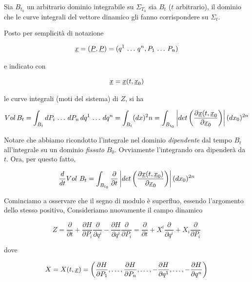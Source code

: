 Sia $ B_{t_0} $ un arbitrario dominio integrabile su $ \Sigma_{T_0} $ sia $ B_t $ ($ t $ arbitrario), il dominio che le curve integrali del vettore dinamico gli fanno corrispondere su $ \Sigma_t $.

Posto per semplicità di notazione

\begin{equation*}
\uline{x} = (\uline{P}, \uline{P}) = (q^1 \, \dots \, q^n, P_1 \, \dots \, P_n)
\end{equation*}

e indicato con

\begin{equation*}
\uline{x} = \uline{x} (t, \uline{x}_0)
\end{equation*}

le curve integrali (moti del sistema) di $ Z $, si ha

\begin{equation*}
Vol \, B_t  = \int_{B_t} dP_i \, \dots \, dP_n \, dq^1 \, \dots \, dq^n = \int_{B_t} (dx)^2n = \int_{B_{t_0}} \left| det \left( \frac{\partial \uline{x} (t, \uline{x}_0}{\partial \uline{x}_0} \right) \right| (dx_0)^{2n}
\end{equation*}

Notare che abbiamo ricondotto l'integrale nel dominio \textit{dipendente} dal tempo $ B_t $ all'integrale su un dominio \textit{fissato} $ B_0 $. Ovviamente l'integrando ora dipenderà da $ t $.
Ora, per questo fatto,

\begin{equation*}
\frac{d}{dt} Vol~B_t = \int_{B_{t_0}} \frac{\partial}{\partial t} \left| det \left( \frac{\partial \uline{x} (t, \uline{x}_0)}{\partial \uline{x}_0} \right) \right| (dx_0)^{2n}
\end{equation*}

Cominciamo a osservare che il segno di modulo è superfluo, essendo l'argomento dello stesso positivo,
Consideriamo nuovamente il campo dinamico

\begin{equation*}
 Z = \frac{\partial}{\partial t} + \frac{\partial H}{\partial P_i} \frac{\partial}{\partial q^i} - \frac{\partial H}{\partial q^i} \frac{\partial}{\partial P_i} = \frac{\partial}{\partial t} + X^i \frac{\partial}{\partial q^i} + X_i \frac{\partial}{\partial P_i}
\end{equation*}

dove

\begin{equation*}
X = X(t,\uline{x}) = \left( \frac{\partial H}{\partial P_1}, \dots ,\frac{\partial H}{\partial P_n}, \dots , -\frac{\partial H}{\partial q^1}, \dots , - \frac{\partial H}{\partial q^n} \right)
\end{equation*}

